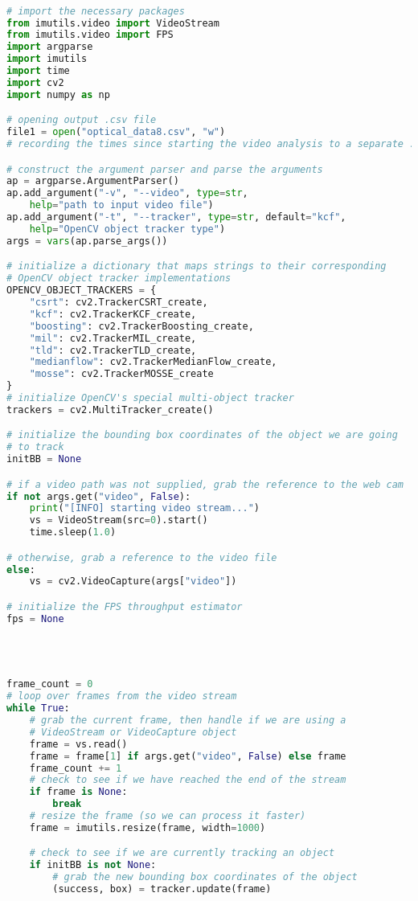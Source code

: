 \documentclass[11pt]{article}
\begin{document}
\begin{footnotesize}
\begin{lstlisting}[language=Python,showstringspaces=false]

# import the necessary packages
from imutils.video import VideoStream
from imutils.video import FPS
import argparse
import imutils
import time
import cv2
import numpy as np

# opening output .csv file
file1 = open("optical_data8.csv", "w")
# recording the times since starting the video analysis to a separate .csv file

# construct the argument parser and parse the arguments
ap = argparse.ArgumentParser()
ap.add_argument("-v", "--video", type=str,
	help="path to input video file")
ap.add_argument("-t", "--tracker", type=str, default="kcf",
	help="OpenCV object tracker type")
args = vars(ap.parse_args())

# initialize a dictionary that maps strings to their corresponding
# OpenCV object tracker implementations
OPENCV_OBJECT_TRACKERS = {
	"csrt": cv2.TrackerCSRT_create,
	"kcf": cv2.TrackerKCF_create,
	"boosting": cv2.TrackerBoosting_create,
	"mil": cv2.TrackerMIL_create,
	"tld": cv2.TrackerTLD_create,
	"medianflow": cv2.TrackerMedianFlow_create,
	"mosse": cv2.TrackerMOSSE_create
}
# initialize OpenCV's special multi-object tracker
trackers = cv2.MultiTracker_create()

# initialize the bounding box coordinates of the object we are going
# to track
initBB = None

# if a video path was not supplied, grab the reference to the web cam
if not args.get("video", False):
	print("[INFO] starting video stream...")
	vs = VideoStream(src=0).start()
	time.sleep(1.0)

# otherwise, grab a reference to the video file
else:
	vs = cv2.VideoCapture(args["video"])

# initialize the FPS throughput estimator
fps = None




frame_count = 0
# loop over frames from the video stream
while True:
	# grab the current frame, then handle if we are using a
	# VideoStream or VideoCapture object
	frame = vs.read()
	frame = frame[1] if args.get("video", False) else frame
	frame_count += 1
	# check to see if we have reached the end of the stream
	if frame is None:
		break
	# resize the frame (so we can process it faster)
	frame = imutils.resize(frame, width=1000)

	# check to see if we are currently tracking an object
	if initBB is not None:
		# grab the new bounding box coordinates of the object
		(success, box) = tracker.update(frame)


\end{lstlisting}
\end{footnotesize}
\end{document}
